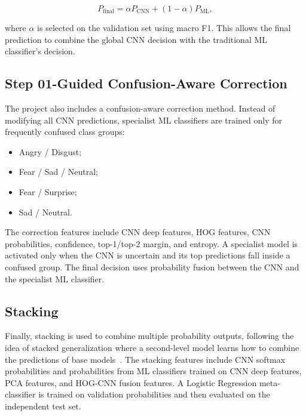 \documentclass[conference]{IEEEtran}
\begin{document}
\begin{equation}
P_{\text{final}} = \alpha P_{\text{CNN}} + (1-\alpha)P_{\text{ML}},
\end{equation}

where $\alpha$ is selected on the validation set using macro F1. This allows
the final prediction to combine the global CNN decision with the traditional ML
classifier's decision.

\subsection{Step 01-Guided Confusion-Aware Correction}

The project also includes a confusion-aware correction method. Instead of
modifying all CNN predictions, specialist ML classifiers are trained only for
frequently confused class groups:
\begin{itemize}
    \item Angry / Disgust;
    \item Fear / Sad / Neutral;
    \item Fear / Surprise;
    \item Sad / Neutral.
\end{itemize}

The correction features include CNN deep features, HOG features, CNN
probabilities, confidence, top-1/top-2 margin, and entropy. A specialist model
is activated only when the CNN is uncertain and its top predictions fall inside
a confused group. The final decision uses probability fusion between the CNN
and the specialist ML classifier.

\subsection{Stacking}

Finally, stacking is used to combine multiple probability outputs, following
the idea of stacked generalization where a second-level model learns how to
combine the predictions of base models~\cite{wolpert1992stacked}. The stacking
features include CNN softmax probabilities and probabilities from ML classifiers
trained on CNN deep features, PCA features, and HOG-CNN fusion features. A
Logistic Regression meta-classifier is trained on validation probabilities and
then evaluated on the independent test set.
\end{document}
